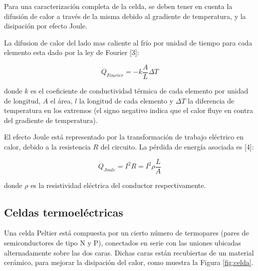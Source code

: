 \documentclass[twoside,twocolumn,a4paper]{article}
\begin{document}
Para una caracterizaci\'on completa de la celda, se deben tener en cuenta la difusi\'on de calor a trav\'es de la misma debido al gradiente de temperatura, y la disipaci\'on por efecto Joule.\newline

\par
La difusion de calor del lado mas caliente al fr\'io por unidad de tiempo para cada elemento esta dado por la ley de Fourier [3]:

\begin{equation}
\label{eq:calor}
\dot{Q}_{Fourier} = -k \frac{A}{L} \Delta T
\end{equation}

donde $k$ es el coeficiente de conductividad t\'ermica de cada elemento por unidad de longitud, $A$ el \'area, $l$ la longitud de cada elemento y $\Delta T$ la diferencia de temperatura en los extremos (el signo negativo indica que el calor fluye en contra del gradiente de temperatura).\newline

\par
El efecto Joule est\'a representado por la transformaci\'on de trabajo el\'ectrico en calor, debido a la resistencia $R$ del circuito. La p\'erdida de energ\'ia asociada es [4]:

\begin{equation}
\label{eq:joule}
\dot{Q}_{Joule} = I^{2}R = I^{2}\rho \frac{L}{A}
\end{equation}

donde $\rho$ es la resistividad el\'ectrica del conductor respectivamente.


\subsection{Celdas termoel\'ectricas}

Una celda Peltier est\'a compuesta por un cierto n\'umero de termopares (pares de semiconductores de tipo N y P), conectados en serie con las uniones ubicadas alternadamente sobre las dos caras. Dichas caras est\'an recubiertas de un material cer\'amico, para mejorar la disipaci\'on del calor, como muestra la Figura \ref{fig:celda}.
\end{document}
